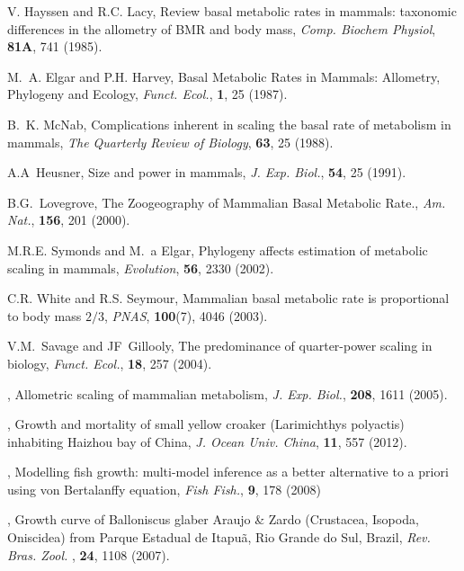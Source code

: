 \documentclass[12pt]{iopart}
\begin{document}
\begin{thebibliography}{100}
 V. Hayssen and R.C. Lacy, {Review basal metabolic rates in mammals:  taxonomic differences in the allometry of BMR and body mass}, \textit{Comp. Biochem Physiol}, \textbf{81A},  741 (1985).

 M.~A. Elgar and P.H. Harvey, {Basal Metabolic Rates in Mammals: Allometry, Phylogeny and Ecology}, \textit{Funct. Ecol.}, \textbf{1}, 25 (1987).

 B.~K. McNab, {Complications inherent in scaling the basal rate of metabolism in mammals}, \textit{The Quarterly Review of Biology}, \textbf{63}, 25 (1988).

 A.A~Heusner, {Size and power in mammals}, \textit{ J. Exp. Biol.}, \textbf{54}, 25 (1991).

 B.G.~Lovegrove, {The Zoogeography of Mammalian Basal Metabolic Rate.}, \textit{Am. Nat.}, \textbf{156}, 201 (2000).

 M.R.E. Symonds and M.~a Elgar, {Phylogeny affects estimation of metabolic scaling in mammals}, \textit{Evolution}, \textbf{56}, 2330 (2002).

 C.R. White and R.S. Seymour, {Mammalian basal metabolic rate is proportional to body mass $2/3$}, \textit{PNAS}, \textbf{100}(7), 4046 (2003).

 V.M.~Savage and JF~Gillooly, {The predominance of quarter-power scaling in biology}, \textit{Funct. Ecol.}, \textbf{18}, 257 (2004).

, {Allometric scaling of mammalian metabolism}, \textit{J. Exp. Biol.}, \textbf{208}, {1611} {(2005)}.

, {Growth and mortality of small yellow croaker (Larimichthys polyactis) inhabiting Haizhou bay of China}, \textit{J. Ocean Univ. China}, \textbf{11}, {557} {(2012)}.

, {Modelling fish growth: multi-model inference as a better alternative to a priori using von Bertalanffy equation}, \textit{Fish Fish.}, \textbf{9}, {178} {(2008)}

, {Growth curve of Balloniscus glaber Araujo \& Zardo (Crustacea, Isopoda, Oniscidea) from Parque Estadual de Itapu\~{a}, Rio Grande do Sul, Brazil}, \textit{Rev. Bras. Zool. }, \textbf{24}, {1108} {(2007)}.


\end{thebibliography}
\end{document}
